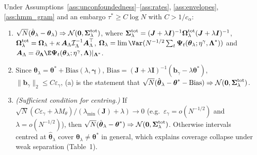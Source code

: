 \begin{theorem}
\label{thm:asymptotics}
Under Assumptions~\ref{ass:unconfoundedness}--\ref{ass:rates}, \ref{ass:envelopes}, \ref{ass:hmm_gram} and an embargo $\tau^*\ge C\log N$ with $C>1/c_\alpha$:
\begin{enumerate}\setlength{\itemsep}{0pt}\setlength{\parskip}{0pt}
\item[(a)] $\sqrt N(\hat{\boldsymbol\theta}_\lambda-\boldsymbol\theta_\lambda)\Rightarrow\mathcal N(\boldsymbol 0,\boldsymbol\Sigma^{\rm tot}_\lambda)$, where $\boldsymbol\Sigma^{\rm tot}_\lambda=(\boldsymbol J+\lambda\boldsymbol I)^{-1}\boldsymbol\Omega^{\rm tot}_\lambda(\boldsymbol J+\lambda\boldsymbol I)^{-1}$,
$\boldsymbol\Omega^{\rm tot}_\lambda=\boldsymbol\Omega_\lambda+\kappa\,\boldsymbol A_\Lambda\mathcal I_\Lambda^{-1}\boldsymbol A_\Lambda^\top$,
$\boldsymbol\Omega_\lambda=\lim\Var(N^{-1/2}\sum_t\boldsymbol\Psi_t(\boldsymbol\theta_\lambda;\eta^\gamma,\boldsymbol\Lambda^*))$ and $\boldsymbol A_\Lambda=\partial_{\boldsymbol\Lambda}\E\boldsymbol\Psi_t(\boldsymbol\theta_\lambda;\eta^\gamma,\boldsymbol\Lambda)|_{\boldsymbol\Lambda^*}$.
\item[(b)] Since $\boldsymbol\theta_\lambda=\boldsymbol\theta^*+\mathrm{Bias}(\lambda,\boldsymbol\gamma)$, $\mathrm{Bias}=(\boldsymbol J+\lambda\boldsymbol I)^{-1}(\boldsymbol b_\gamma-\lambda\boldsymbol\theta^*)$, $\|\boldsymbol b_\gamma\|_2\le C\varepsilon_\gamma$, (a) is the statement that $\sqrt N(\hat{\boldsymbol\theta}_\lambda-\boldsymbol\theta^*-\mathrm{Bias})\Rightarrow\mathcal N(\boldsymbol0,\boldsymbol\Sigma^{\rm tot}_\lambda)$.
\item[(c)] \emph{(Sufficient condition for centring.)} If $\sqrt N(C\varepsilon_\gamma+\lambda M_\theta)/(\lambda_{\min}(\boldsymbol J)+\lambda)\to0$ (e.g.\ $\varepsilon_\gamma=o(N^{-1/2})$ and $\lambda=o(N^{-1/2})$), then $\sqrt N(\hat{\boldsymbol\theta}_\lambda-\boldsymbol\theta^*)\Rightarrow\mathcal N(\boldsymbol0,\boldsymbol\Sigma^{\rm tot}_\lambda)$.
Otherwise intervals centred at $\hat{\boldsymbol\theta}_\lambda$ cover $\boldsymbol\theta_\lambda\neq\boldsymbol\theta^*$ in general, which explains coverage collapse under weak separation (Table~1).
\end{enumerate}
\end{theorem}

